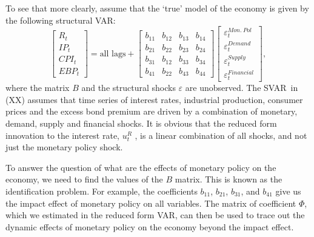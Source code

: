 \documentclass[10pt]{article}
\begin{document}
To see that more clearly, assume that the `true' model of the economy is
given by the following structural VAR:%
\begin{equation}
\begin{bmatrix}
R_{t} \\ 
IP_{t} \\ 
CPI_{t} \\ 
EBP_{t}%
\end{bmatrix}%
=\text{all lags}+\left[ 
\begin{array}{cccc}
b_{11} & b_{12} & b_{13} & b_{14} \\ 
b_{21} & b_{22} & b_{23} & b_{24} \\ 
b_{31} & b_{12} & b_{33} & b_{34} \\ 
b_{41} & b_{22} & b_{43} & b_{44}%
\end{array}%
\right] 
\begin{bmatrix}
\varepsilon _{t}^{Mon.\ Pol} \\ 
\varepsilon _{t}^{Demand} \\ 
\varepsilon _{t}^{Supply} \\ 
\varepsilon _{t}^{Financial}%
\end{bmatrix}%
,  \label{eq:GK_VAR}
\end{equation}%
where the matrix $B$ and the structural shocks $\varepsilon $ are
unobserved. The SVAR\ in (XX) assumes that time series of interest rates,
industrial production, consumer prices and the excess bond premium are
driven by a combination of monetary, demand, supply and financial shocks. It
is obvious that the reduced form innovation to the interest rate, $u_{t}^{R}$%
, is a linear combination of all shocks, and not just the monetary policy
shock.

To answer the question of what are the effects of monetary policy on the
economy, we need to find the values of the $B$ matrix. This is known as the
identification problem. For example, the coefficients $b_{11}$, $b_{21}$, $%
b_{31}$, and $b_{41}$ give us the impact effect of monetary policy on all
variables. The matrix of coefficient $\Phi $, which we estimated in the
reduced form VAR, can then be used to trace out the dynamic effects of
monetary policy on the economy beyond the impact effect.
\end{document}

